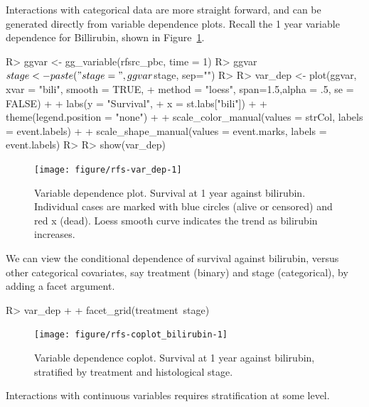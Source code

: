 \documentclass[nojss]{jss}\usepackage[]{graphicx}\usepackage[]{color}
\begin{document}
Interactions with categorical data are more straight forward, and can be generated directly from variable dependence plots. Recall the 1 year variable dependence for Billirubin, shown in Figure~\ref{fig:var_dep}. 
\begin{Schunk}
\begin{Sinput}
R> ggvar <- gg_variable(rfsrc_pbc, time = 1)
R> ggvar$stage <- paste("stage=", ggvar$stage, sep="")
R> 
R> var_dep <- plot(ggvar, xvar = "bili", smooth = TRUE, 
+                 method = "loess", span=1.5,alpha = .5, se = FALSE) + 
+   labs(y = "Survival", 
+        x = st.labs["bili"]) + 
+   theme(legend.position = "none") + 
+   scale_color_manual(values = strCol, labels = event.labels) + 
+   scale_shape_manual(values = event.marks, labels = event.labels)
R> 
R> show(var_dep)
\end{Sinput}
\begin{figure}[!htpb]

{\centering \texttt{[image: figure/rfs-var\_dep-1]} 

}

\caption[Variable dependence plot]{Variable dependence plot. Survival at 1 year against bilirubin. Individual cases are marked with blue circles (alive or censored) and red x (dead). Loess smooth curve indicates the trend as bilirubin  increases.\label{fig:var_dep}}
\end{figure}
\end{Schunk}

We can view the conditional dependence of survival against bilirubin, versus other categorical covariates, say treatment (binary) and stage (categorical), by adding a facet argument.
\begin{Schunk}
\begin{Sinput}
R> var_dep + 
+   facet_grid(treatment~stage)
\end{Sinput}
\begin{figure}[!htpb]

{\centering \texttt{[image: figure/rfs-coplot\_bilirubin-1]} 

}

\caption[Variable dependence coplot]{Variable dependence coplot. Survival at 1 year against bilirubin, stratified by treatment and histological stage.\label{fig:coplot_bilirubin}}
\end{figure}
\end{Schunk}

Interactions with continuous variables requires stratification at some level.
\end{document}

